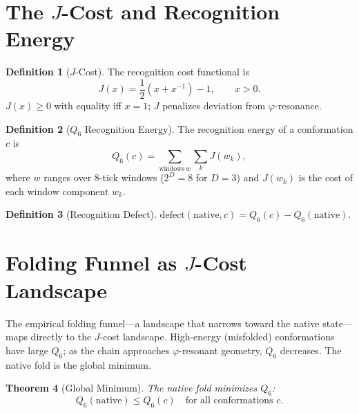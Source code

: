 \documentclass[12pt,a4paper]{article}
\newtheorem{theorem}{Theorem}[section]
\theoremstyle{definition}
\newtheorem{definition}[theorem]{Definition}
\theoremstyle{remark}
\begin{document}
\section{The $J$-Cost and Recognition Energy}
\label{sec:jcost}

\begin{definition}[$J$-Cost]
\label{def:jcost}
The recognition cost functional is
\begin{equation}
  J(x) = \frac{1}{2}(x + x^{-1}) - 1, \qquad x > 0.
\end{equation}
$J(x) \geq 0$ with equality iff $x = 1$; $J$ penalizes deviation from
$\varphi$-resonance.
\end{definition}

\begin{definition}[$Q_6$ Recognition Energy]
\label{def:q6}
The recognition energy of a conformation $c$ is
\begin{equation}
  Q_6(c) = \sum_{\text{windows}~w} \sum_k J(w_k),
\end{equation}
where $w$ ranges over 8-tick windows ($2^D = 8$ for $D = 3$) and
$J(w_k)$ is the cost of each window component $w_k$.
\end{definition}

\begin{definition}[Recognition Defect]
\label{def:defect}
$\mathrm{defect}(\mathrm{native}, c) = Q_6(c) - Q_6(\mathrm{native})$.
\end{definition}

\section{Folding Funnel as $J$-Cost Landscape}
\label{sec:funnel}

The empirical folding funnel---a landscape that narrows toward the
native state---maps directly to the $J$-cost landscape.  High-energy
(misfolded) conformations have large $Q_6$; as the chain approaches
$\varphi$-resonant geometry, $Q_6$ decreases.  The native fold is the
global minimum.

\begin{theorem}[Global Minimum]
\label{thm:global}
The native fold minimizes $Q_6$:
\begin{equation}
  Q_6(\mathrm{native}) \leq Q_6(c) \quad \text{for all conformations } c.
\end{equation}
\end{theorem}
\end{document}

